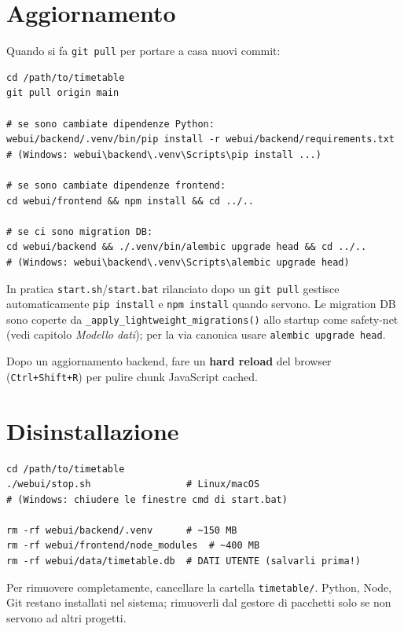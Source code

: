 \section{Aggiornamento}

Quando si fa \texttt{git pull} per portare a casa nuovi commit:

\begin{lstlisting}[style=shell]
cd /path/to/timetable
git pull origin main

# se sono cambiate dipendenze Python:
webui/backend/.venv/bin/pip install -r webui/backend/requirements.txt
# (Windows: webui\backend\.venv\Scripts\pip install ...)

# se sono cambiate dipendenze frontend:
cd webui/frontend && npm install && cd ../..

# se ci sono migration DB:
cd webui/backend && ./.venv/bin/alembic upgrade head && cd ../..
# (Windows: webui\backend\.venv\Scripts\alembic upgrade head)
\end{lstlisting}

In pratica \texttt{start.sh}/\texttt{start.bat} rilanciato dopo un
\texttt{git pull} gestisce automaticamente \texttt{pip install} e
\texttt{npm install} quando servono. Le migration DB sono coperte da
\texttt{\_apply\_lightweight\_migrations()} allo startup come
safety-net (vedi capitolo \emph{Modello dati}); per la via canonica
usare \texttt{alembic upgrade head}.

Dopo un aggiornamento backend, fare un \textbf{hard reload} del
browser (\texttt{Ctrl+Shift+R}) per pulire chunk JavaScript cached.

\section{Disinstallazione}

\begin{lstlisting}[style=shell]
cd /path/to/timetable
./webui/stop.sh                 # Linux/macOS
# (Windows: chiudere le finestre cmd di start.bat)

rm -rf webui/backend/.venv      # ~150 MB
rm -rf webui/frontend/node_modules  # ~400 MB
rm -rf webui/data/timetable.db  # DATI UTENTE (salvarli prima!)
\end{lstlisting}

Per rimuovere completamente, cancellare la cartella \texttt{timetable/}.
Python, Node, Git restano installati nel sistema; rimuoverli dal
gestore di pacchetti solo se non servono ad altri progetti.

